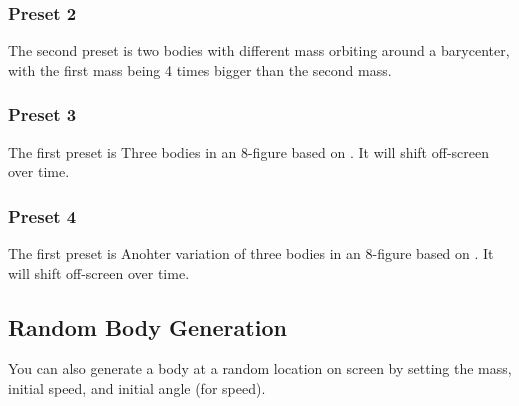 \documentclass{article}
\begin{document}
\subsubsection{Preset 2}
The second preset is two bodies with different mass orbiting around a barycenter, with the first mass being 4 times bigger than the second mass.

\subsubsection{Preset 3}
The first preset is Three bodies in an 8-figure based on \cite{chenciner_montgomery_2000}. It will shift off-screen over time.

\subsubsection{Preset 4}
The first preset is Anohter variation of three bodies in an 8-figure based on \cite{chenciner_montgomery_2000}. It will shift off-screen over time.

\subsection{Random Body Generation}
You can also generate a body at a random location on screen by setting the mass, initial speed, and initial angle (for speed).

\printbibliography
\end{document}
